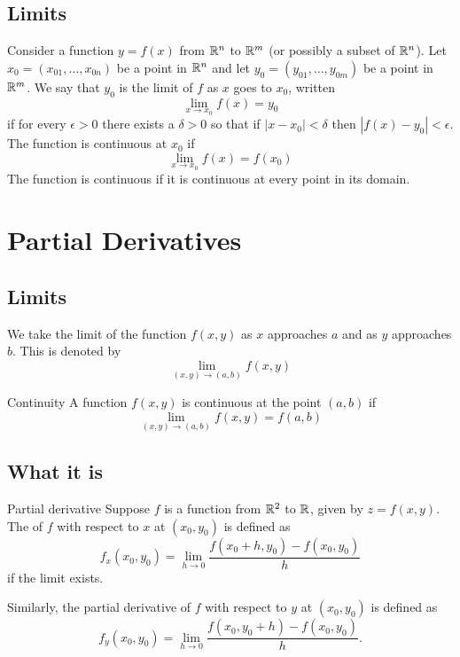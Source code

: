 \subsection{Limits}
Consider a function $y = f(x)$ from $\mathbb R^n$ to $\mathbb R^m$ (or possibly a subset of $\mathbb R^n$). Let $x_0 = (x_{01},\dots,x_{0n})$ be a point in $\mathbb R^n$ and let $y_0 = (y_{01},\dots,y_{0m})$ be a point in $\mathbb R^m$. We say that $y_0$ is the limit of $f$ as $x$ goes to $x_0$, written
\begin{equation}
\lim_{x\to x_0} f(x) = y_0
\end{equation}
if for every $\epsilon > 0$ there exists a $\delta > 0$ so that if $|x-x_0|<\delta$ then $|f(x)-y_0|<\epsilon$. The function is continuous at $x_0$ if
\begin{equation}
\lim_{x\to x_0} f(x) = f(x_0)
\end{equation}
The function is continuous if it is continuous at every point in its domain.
\pagebreak

\section{Partial Derivatives}
\subsection{Limits}
We take the limit of the function $f(x,y)$ as $x$ approaches $a$ and as $y$ approaches $b$. This is denoted by
\[ \lim_{(x,y)\to(a,b)}f(x,y) \]

\begin{defn}{Continuity}{}
A function $f(x,y)$ is continuous at the point $(a,b)$ if
\[ \lim_{(x,y)\to(a,b)} f(x,y) = f(a,b) \]
\end{defn}

\subsection{What it is}
\begin{defn}{Partial derivative}{}
Suppose $f$ is a function from $\mathbb R^2$ to $\mathbb R$, given by $z=f(x,y)$. The  of $f$ with respect to $x$ at $(x_0,y_0)$ is defined as
\begin{equation}
f_x(x_0,y_0) = \lim_{h \to 0}\frac{f(x_0+h,y_0)-f(x_0,y_0)}{h}
\end{equation}
if the limit exists.

Similarly, the partial derivative of $f$ with respect to $y$ at $(x_0,y_0)$ is defined as
\begin{equation}
f_y(x_0,y_0) = \lim_{h \to 0}\frac{f(x_0,y_0+h)-f(x_0,y_0)}{h}.
\end{equation}
\end{defn}

